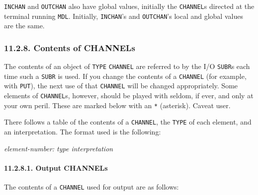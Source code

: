\documentclass[a4paper,]{article}
\let\oldparagraph\paragraph
\renewcommand{\paragraph}[1]{\oldparagraph{#1}\mbox{}}
\begin{document}
\texttt{INCHAN} and \texttt{OUTCHAN} also have global values, initially the \texttt{CHANNEL}s directed at the terminal
running \texttt{MDL}. Initially, \texttt{INCHAN}'s and \texttt{OUTCHAN}'s local and global values are the same.

\subsubsection{11.2.8. Contents of CHANNELs}\label{contents-of-channels}

The contents of an object of \texttt{TYPE} \texttt{CHANNEL}  are referred to by the I/O
\texttt{SUBR}s each time such a \texttt{SUBR} is used. If you change the contents of a \texttt{CHANNEL} (for example, with
\texttt{PUT}), the next use of that \texttt{CHANNEL} will be changed appropriately. Some elements of \texttt{CHANNEL}s,
however, should be played with seldom, if ever, and only at your own peril. These are marked below with an \texttt{*}
(asterisk). Caveat user.

There follows a table of the contents of a \texttt{CHANNEL}, the \texttt{TYPE} of each element, and an interpretation. The
format used is the following:

\emph{element-number: type interpretation}

\paragraph{11.2.8.1. Output CHANNELs}\label{output-channels}

The contents of a \texttt{CHANNEL} used for output are as follows:
\end{document}
